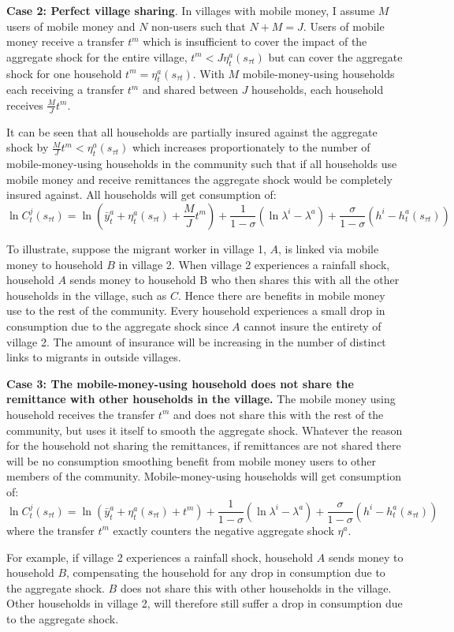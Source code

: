 \textbf{Case 2: Perfect village sharing}. In villages with mobile money, I assume $M$ users of mobile money and $N$ non-users such that $N+M=J$. Users of mobile money receive a transfer $t^m$ which is insufficient to cover the impact of the aggregate shock for the entire village, $t^m<J\eta_t^a(s_{\tau t})$ but can cover the aggregate shock for one household $t^m=\eta_t^a(s_{\tau t})$. With $M$ mobile-money-using households each receiving a transfer $t^m$ and shared between $J$ households, each household receives $\frac{M}{J}t^m$. 

It can be seen that all households are partially insured against the aggregate shock by $\frac{M}{J} t^m<\eta_t^a(s_{\tau t})$ which increases proportionately to the number of mobile-money-using households in the community such that if all households use mobile money and receive remittances the aggregate shock would be completely insured against. All households will get consumption of:
\begin{equation} \label{eq: perfect sharing}
\ln C_t^j(s_{\tau t}) = \ln (\bar{y}^a_t + \eta_t^a(s_{\tau t}) + \frac{M}{J}t^m) + \frac{1}{1-\sigma}(\ln \lambda^i- \lambda^a) + \frac{\sigma}{1-\sigma}(h^i- h^a_t(s_{\tau t}))
\end{equation}

To illustrate, suppose the migrant worker in village 1, $A$, is linked via mobile money to household $B$ in village 2. When village 2 experiences a rainfall shock, household $A$ sends money to household B who then shares this with all the other households in the village, such as $C$. Hence there are benefits in mobile money use to the rest of the community. Every household experiences a small drop in consumption due to the aggregate shock since $A$ cannot insure the entirety of village 2. The amount of insurance will be increasing in the number of distinct links to migrants in outside villages. 

\textbf{Case 3: The mobile-money-using household does not share the remittance with other households in the village.}
The mobile money using household receives the transfer $t^m$ and does not share this with the rest of the community,  but uses it itself to smooth the aggregate shock. Whatever the reason for the household not sharing the remittances, if remittances are not shared there will be no consumption smoothing benefit from mobile money users to other members of the community.  Mobile-money-using households will get consumption of:
\begin{equation} \label{eq: MM users}
\ln C_t^j(s_{\tau t}) = \ln (\bar{y}^a_t + \eta_t^a(s_{\tau t}) + t^m) + \frac{1}{1-\sigma}(\ln \lambda^i- \lambda^a) + \frac{\sigma}{1-\sigma}(h^i- h^a_t(s_{\tau t}))
\end{equation}
where the transfer $t^m$ exactly counters the negative aggregate shock $\eta^a$.

For example, if village 2 experiences a rainfall shock, household $A$ sends money to household $B$, compensating the household for any drop in consumption due to the aggregate shock. $B$ does not share this with other households in the village. Other households in village 2, will therefore still suffer a drop in consumption due to the aggregate shock.




